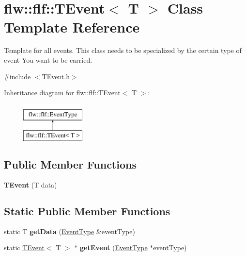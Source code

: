 \hypertarget{classflw_1_1flf_1_1TEvent}{}\section{flw\+:\+:flf\+:\+:T\+Event$<$ T $>$ Class Template Reference}
\label{classflw_1_1flf_1_1TEvent}


Template for all events. This class needs to be specialized by the certain type of event You want to be carried.  




{\ttfamily \#include $<$T\+Event.\+h$>$}

Inheritance diagram for flw\+:\+:flf\+:\+:T\+Event$<$ T $>$\+:\begin{figure}[H]
\begin{center}
\leavevmode
\includegraphics[height=2.000000cm]{classflw_1_1flf_1_1TEvent}
\end{center}
\end{figure}
\subsection*{Public Member Functions}
\begin{DoxyCompactItemize}
\item 
{\bfseries T\+Event} (T data)\hypertarget{classflw_1_1flf_1_1TEvent_a3695b45c81e7b48fa84a73be598330ba}{}\label{classflw_1_1flf_1_1TEvent_a3695b45c81e7b48fa84a73be598330ba}

\end{DoxyCompactItemize}
\subsection*{Static Public Member Functions}
\begin{DoxyCompactItemize}
\item 
static T {\bfseries get\+Data} (\hyperlink{classflw_1_1flf_1_1EventType}{Event\+Type} \&event\+Type)\hypertarget{classflw_1_1flf_1_1TEvent_ad75b4bffa980e66bbeb63d5bb2e5d36a}{}\label{classflw_1_1flf_1_1TEvent_ad75b4bffa980e66bbeb63d5bb2e5d36a}

\item 
static \hyperlink{classflw_1_1flf_1_1TEvent}{T\+Event}$<$ T $>$ $\ast$ {\bfseries get\+Event} (\hyperlink{classflw_1_1flf_1_1EventType}{Event\+Type} $\ast$event\+Type)\hypertarget{classflw_1_1flf_1_1TEvent_a7044da7492c0b20cffa9dd4de48ceac0}{}\label{classflw_1_1flf_1_1TEvent_a7044da7492c0b20cffa9dd4de48ceac0}

\end{DoxyCompactItemize}


